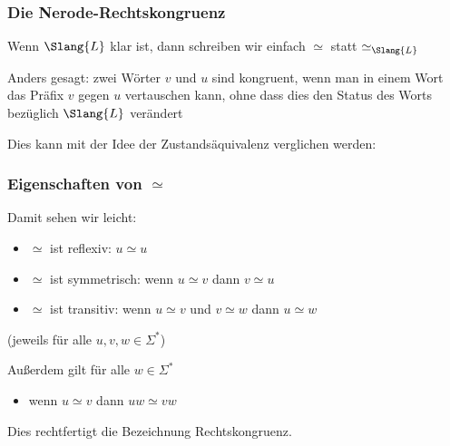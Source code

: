 \documentclass[aspectratio=1610,onlymath]{beamer}
\begin{document}
\begin{frame}\frametitle{Die Nerode-Rechtskongruenz}

Wenn $\Slang{L}$ klar ist, dann schreiben wir einfach $\simeq$ statt $\simeq_{\Slang{L}}$

\pause\medskip

\alert{Anders gesagt:} zwei Wörter $v$ und $u$ sind kongruent, wenn man in einem Wort das Präfix $v$ gegen $u$ vertauschen kann, ohne dass dies den Status des Worts bezüglich $\Slang{L}$ verändert
\bigskip

Dies kann mit der Idee der Zustandsäquivalenz verglichen werden:


\end{frame}

\begin{frame}\frametitle{Eigenschaften von $\simeq$}

%
\smallskip\pause

Damit sehen wir leicht:
\begin{itemize}
\item $\simeq$ ist \alert{reflexiv}: $u\simeq u$
\item $\simeq$ ist \alert{symmetrisch}: wenn $u\simeq v$ dann $v\simeq u$
\item $\simeq$ ist \alert{transitiv}: wenn $u\simeq v$ und $v\simeq w$ dann $u\simeq w$
\end{itemize}
(jeweils für alle $u,v,w\in \Sigma^*$)
\medskip

%
\smallskip\pause

Außerdem gilt für alle $w\in\Sigma^*$
\begin{itemize}
\item wenn $u\simeq v$ dann $uw\simeq vw$
\end{itemize}
\smallskip

%
\smallskip

Dies rechtfertigt die Bezeichnung \alert{Rechtskongruenz}.

\end{frame}
\end{document}
